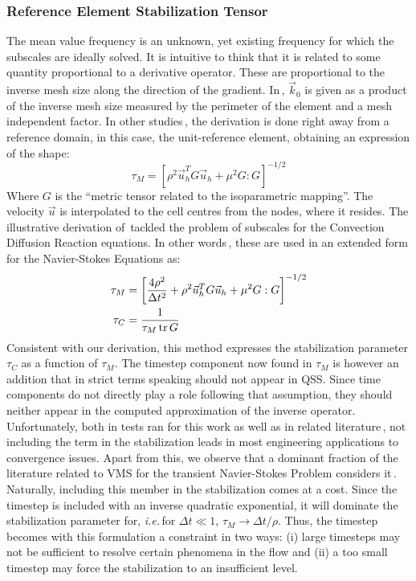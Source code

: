 \subsubsection*{Reference Element Stabilization Tensor}
The mean value frequency is an unknown, yet existing frequency for which the subscales are ideally solved. It is intuitive to think that it is related to some quantity proportional to a derivative operator. These are proportional to the inverse mesh size along the direction of the gradient. In\,\cite{Codina2002}, $\vec{k}_0$ is given as a product of the inverse mesh size measured by the perimeter of the element and a mesh independent factor. In other studies\,\cite{Principe2010}, the derivation is done right away from a reference domain, in this case, the unit-reference element, obtaining an expression of the shape:
\begin{equation*}
	\tau_M ={ \left[\rho^2 \vec{u}^{T}_{h} G\vec{u}_{h} + \mu^2G:G\right]}^{-1/2}
\end{equation*}
Where $G$ is the ``metric tensor related to the isoparametric mapping''\cite{Principe2010}. The velocity $\vec{u}$ is interpolated to the cell centres from the nodes, where it resides. The illustrative derivation of\,\cite{Principe2010} tackled the problem of subscales for the Convection Diffusion Reaction equations. In other words\,\cite{Bazilevs2007, Masud2011}, these are used in an extended form for the Navier-Stokes Equations as:
\begin{equation}
	\begin{split}
		\tau_M &= {\left[\frac{4\rho^2}{\Delta t^2} + \rho^2 \vec{u}^{T}_{h} G\vec{u}_{h} + \mu^2G:G\right]}^{-1/2}\\
		\tau_C &= \frac{1}{\tau_M\operatorname{tr}{G}}
	\end{split}
	\label{eqn:tensor_based_stab}
\end{equation}
Consistent with our derivation, this method expresses the stabilization parameter $\tau_C$ as a function of $\tau_M$. The timestep component now found in $\tau_M$ is however an addition that in strict terms speaking should not appear in QSS. Since time components do not directly play a role following that assumption, they should neither appear in the computed approximation of the inverse operator. Unfortunately, both in tests ran for this work as well as in related literature\,\cite{Hsu2010, Hsu2010}, not including the term in the stabilization leads in most engineering applications to convergence issues. Apart from this, we observe that a dominant fraction of the literature related to VMS for the transient Navier-Stokes Problem considers it\,\cite{Whiting2001, Yan2018, Masud2011, Bazilevs2007}. Naturally, including this member in the stabilization comes at a cost. Since the timestep is included with an inverse quadratic exponential, it will dominate the stabilization parameter for, \textit{i.e.}\,for $\Delta t \ll 1$, $\tau_M \rightarrow \Delta t / \rho$. Thus, the timestep becomes with this formulation a constraint in two ways: (i) large timesteps may not be sufficient to resolve certain phenomena in the flow and (ii) a too small timestep may force the stabilization to an insufficient level.

